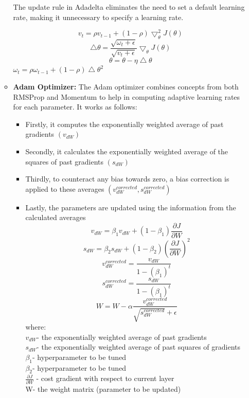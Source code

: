 \begin{itemize}
\begin{itemize}
    The update rule in Adadelta eliminates the need to set a default learning rate, making it unnecessary to specify a learning rate.
    
    \[
    v_{t}=\rho v_{t-1}+(1-\rho)\bigtriangledown_{\theta}^{2}J(\theta)
    \]
    \[
    \bigtriangleup\theta=\frac{\sqrt{\omega_{t}+\epsilon}}{\sqrt{v_{t}+\epsilon}}\bigtriangledown_{\theta}J(\theta)
    \]
    \[
    \theta=\theta-\eta\bigtriangleup\theta
    \]
    $\omega_{t}=\rho\omega_{t-1} + (1-\rho)\bigtriangleup\theta^{2}$
    \item \textbf{Adam Optimizer: } The Adam optimizer combines concepts from both RMSProp and Momentum to help in computing adaptive learning rates for each parameter. It works as follows:
    \begin{itemize}
        \item Firstly, it computes the exponentially weighted average of past gradients $(v_{dW})$
        \item  Secondly, it calculates the exponentially weighted average of the squares of past gradients $(s_{dW})$
        \item Thirdly, to counteract any bias towards zero, a bias correction is applied to these averages  $(v_{dW}^{corrected}, s_{dW}^{corrected})$
        \item Lastly, the parameters are updated using the information from the calculated averages\\
        \[v_{dW}=\beta_{1}v_{dW}+(1-\beta_{1})\frac{\partial J}{\partial W}\]
        \[
        s_{dW}=\beta_{2}s_{dW}+(1-\beta_{2}) \left(\frac{\partial J}{\partial W}\right)^{2}
        \]
        \[
         v_{dW}^{corrected}=\frac{v_{dW}}{1-(\beta_{1})^{t}}
        \]
        \[
         s_{dW}^{corrected}=\frac{s_{dW}}{1-(\beta_{1})^{t}}
        \]
        \[
        W=W-\alpha\frac{v_{dW}^{corrected}}{\sqrt{s_{dW}^{corrected}} + \epsilon}
        \]
        where:\\
        $v_{dW}$-  the exponentially weighted average of past gradients\\
        $s_{dW}$- the exponentially weighted average of past squares of gradients\\
        $\beta_{1}$- hyperparameter to be tuned\\
        $\beta_{2}$- hyperparameter to be tuned\\
        $\frac{\partial J}{\partial W}$ - cost gradient with respect to current layer\\
        W- the weight matrix (parameter to be updated)\\

\end{itemize}
\end{itemize}
\end{itemize}
